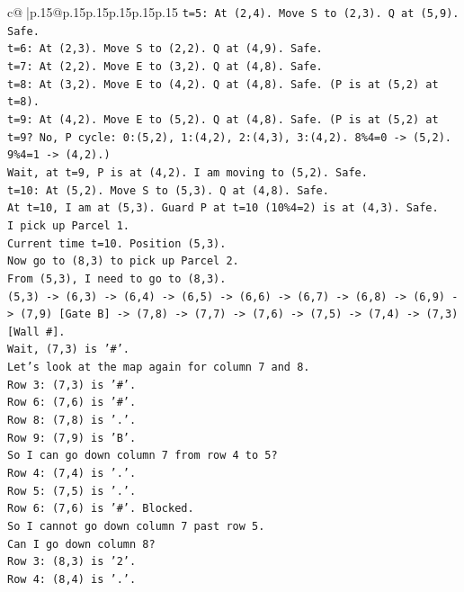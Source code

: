 \documentclass{article}
\begin{document}
{\begin{supertabular}{c@{$\;$}|p{.15\linewidth}@{}p{.15\linewidth}p{.15\linewidth}p{.15\linewidth}p{.15\linewidth}p{.15\linewidth}}
{{{\texttt{t=5: At (2,4). Move S to (2,3). Q at (5,9). Safe.} \\
\texttt{t=6: At (2,3). Move S to (2,2). Q at (4,9). Safe.} \\
\texttt{t=7: At (2,2). Move E to (3,2). Q at (4,8). Safe.} \\
\texttt{t=8: At (3,2). Move E to (4,2). Q at (4,8). Safe. (P is at (5,2) at t=8).} \\
\texttt{t=9: At (4,2). Move E to (5,2). Q at (4,8). Safe. (P is at (5,2) at t=9? No, P cycle: 0:(5,2), 1:(4,2), 2:(4,3), 3:(4,2). 8\%4=0 {-}> (5,2). 9\%4=1 {-}> (4,2).)} \\
\texttt{Wait, at t=9, P is at (4,2). I am moving to (5,2). Safe.} \\
\texttt{t=10: At (5,2). Move S to (5,3). Q at (4,8). Safe.} \\
\texttt{At t=10, I am at (5,3). Guard P at t=10 (10\%4=2) is at (4,3). Safe.} \\
\texttt{I pick up Parcel 1.} \\
\texttt{Current time t=10. Position (5,3).} \\
\texttt{Now go to (8,3) to pick up Parcel 2.} \\
\texttt{From (5,3), I need to go to (8,3).} \\
\texttt{(5,3) {-}> (6,3) {-}> (6,4) {-}> (6,5) {-}> (6,6) {-}> (6,7) {-}> (6,8) {-}> (6,9) {-}> (7,9) {[}Gate B{]} {-}> (7,8) {-}> (7,7) {-}> (7,6) {-}> (7,5) {-}> (7,4) {-}> (7,3) {[}Wall \#{]}.} \\
\texttt{Wait, (7,3) is '\#'.} \\
\texttt{Let's look at the map again for column 7 and 8.} \\
\texttt{Row 3: (7,3) is '\#'.} \\
\texttt{Row 6: (7,6) is '\#'.} \\
\texttt{Row 8: (7,8) is '.'.} \\
\texttt{Row 9: (7,9) is 'B'.} \\
\texttt{So I can go down column 7 from row 4 to 5?} \\
\texttt{Row 4: (7,4) is '.'.} \\
\texttt{Row 5: (7,5) is '.'.} \\
\texttt{Row 6: (7,6) is '\#'. Blocked.} \\
\texttt{So I cannot go down column 7 past row 5.} \\
\texttt{Can I go down column 8?} \\
\texttt{Row 3: (8,3) is '2'.} \\
\texttt{Row 4: (8,4) is '.'.} \\
}}}
\end{supertabular}}
\end{document}
